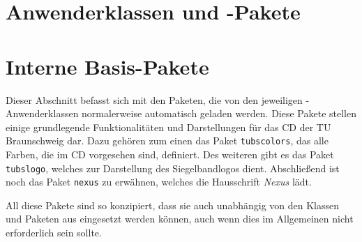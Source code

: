


\tableofcontents


\newcommand{\newdocumentclass}[1]{\textcolor{tuGreenDark}{\lstinline{#1}}}
\newcommand{\newpackage}[1]{\textcolor{tuGreenDark}{\lstinline{#1}}}





\part{Anwenderklassen und -Pakete}\label{part:user}








\appendix

\part{Interne Basis-Pakete}\label{part:packages}

Dieser Abschnitt befasst sich mit den Paketen, die von den jeweiligen
\tubslatex-Anwender\-klassen normalerweise automatisch geladen werden.
Diese Pakete stellen einige grundlegende Funktionalitäten und Darstellungen
für das \acs{CD} der TU Braunschweig dar. Dazu gehören zum einen das Paket
\newpackage{tubscolors}, das alle Farben, die im \acs{CD} vorgesehen sind,
definiert. Des weiteren gibt es das Paket \newpackage{tubslogo}, welches
zur Darstellung des Siegelbandlogos dient. Abschließend ist noch das Paket
\newpackage{nexus} zu erwähnen, welches die Hausschrift \emph{Nexus}
lädt.

All diese Pakete sind so konzipiert, dass sie auch unabhängig von den
Klassen und Paketen aus \tubslatex eingesetzt werden können, auch wenn dies
im Allgemeinen nicht erforderlich sein sollte.

